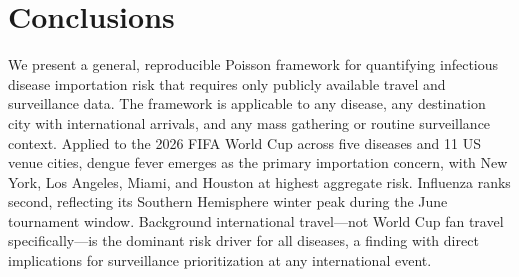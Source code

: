 \documentclass[12pt]{article}
\begin{document}
\section*{Conclusions}

We present a general, reproducible Poisson framework for quantifying
infectious disease importation risk that requires only publicly
available travel and surveillance data. The framework is applicable
to any disease, any destination city with international arrivals,
and any mass gathering or routine surveillance context. Applied to
the 2026 FIFA World Cup across five diseases and 11 US venue cities,
dengue fever emerges as the primary importation concern, with New
York, Los Angeles, Miami, and Houston at highest aggregate risk.
Influenza ranks second, reflecting its Southern Hemisphere winter
peak during the June tournament window. Background international
travel---not World Cup fan travel specifically---is the dominant
risk driver for all diseases, a finding with direct implications for
surveillance prioritization at any international event.



\end{document}
